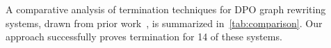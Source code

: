 


A comparative analysis of termination techniques for DPO graph rewriting systems, drawn from prior work~\cite{plump1995ontermination,plump2018modular,bruggink2014termination,bruggink2015proving,endrullis2024generalized_arxiv_v2,overbeek2024termination_lmcs}, is summarized in~\autoref{tab:comparison}. Our approach successfully proves termination for 14 of these systems.
